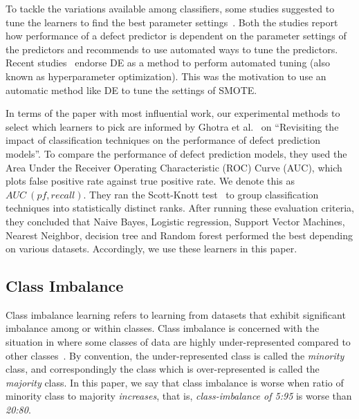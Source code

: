 \documentclass[10pt,conference]{IEEEtran}
\theoremstyle{break}
\theoremstyle{break}
\begin{document}
To tackle the variations available among classifiers, some studies suggested to tune the learners to find the best parameter settings~\cite{tantithamthavorn2016automated, fu2016tuning}.  Both the studies report how performance of a defect predictor is dependent on the parameter settings of the predictors and recommends to use automated ways to tune the predictors.
Recent studies~\cite{fu2016tuning, agrawal2016wrong} endorse DE as a method to perform automated tuning (also known as hyperparameter optimization). This was the motivation to use an automatic method like DE to
tune the settings of SMOTE.

In terms of the paper with most influential work,
our experimental methods to select which learners to pick are informed 
by  Ghotra et al.~\cite{ghotra2015revisiting} on ``Revisiting the impact of classification techniques on the performance of defect prediction models''. To 
compare  the  performance  of  defect prediction  models,  they  used  the  Area  Under  the Receiver Operating Characteristic (ROC) Curve (AUC), which plots  false  positive  rate  against   true  positive rate. We denote this as $AUC\ (pf, recall)$. 
They ran the Scott-Knott test~\cite{jelihovschi2014scottknott} to group classification techniques into statistically distinct ranks. After running these evaluation criteria, they concluded that Naive Bayes, Logistic regression, Support Vector Machines, Nearest Neighbor, decision tree and Random forest performed the best depending on various datasets. Accordingly, 
we use these learners in this paper.

\subsection{Class Imbalance }
\label{sect:motivation}

Class imbalance learning refers to learning from datasets that exhibit significant imbalance among or within classes. Class imbalance  is concerned with the situation in where some classes of data are
highly under-represented compared to other classes~\cite{he2009learning}. By convention,
the under-represented class is called the {\em minority} class,
and correspondingly the class which is over-represented is called the
{\em majority} class. In this paper, we say that class imbalance is worse when ratio of minority class to majority {\em increases}, that is,
{\em class-imbalance of 5:95} is worse than {\em 20:80}.
\end{document}
